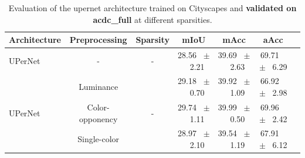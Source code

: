 \begin{table}[h]
  \centering
  \caption{Evaluation of the upernet architecture trained on Cityscapes and \textbf{validated on acdc_full} at different sparsities.}
  \begin{tabular}{@{}lccc ccc@{}}
    \toprule
    Architecture & Preprocessing & Sparsity & mIoU & mAcc & aAcc \\
    \midrule
    UPerNet & - & - & 28.56 ~$\pm$~ 2.21 & 39.69 ~$\pm$~ 2.63 & 69.71 ~$\pm$~ 6.29 \\
    \midrule
    \midrule
    \multirow{3}{*}{UPerNet} & Luminance & \multirow{3}{*}{-} & 29.18 ~$\pm$~ 0.70 & 39.92 ~$\pm$~ 1.09 & 66.92 ~$\pm$~ 2.98 \\
    & Color-opponency & & 29.74 ~$\pm$~ 1.11 & 39.99 ~$\pm$~ 0.50 & 69.96 ~$\pm$~ 2.42 \\
    & Single-color & & 28.97 ~$\pm$~ 2.10 & 39.54 ~$\pm$~ 1.19 & 67.91 ~$\pm$~ 6.12 \\
    \midrule
    \bottomrule
  \end{tabular}
  \label{tab:sparse_upernet_acdc_full}
\end{table}